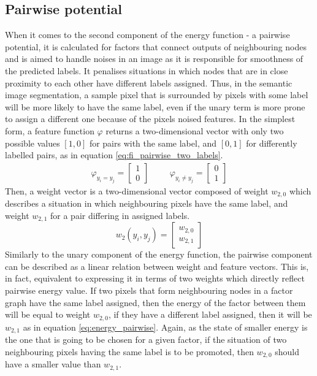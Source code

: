 \subsection{Pairwise potential}
\label{sec:pariwise_potential}

When it comes to the second component of the energy function - a pairwise potential, it is calculated for factors that connect outputs of neighbouring nodes and is aimed to handle noises in an image as it is responsible for smoothness of the predicted labels. It penalises situations in which nodes that are in close proximity to each other have different labels assigned. Thus, in the semantic image segmentation, a sample pixel that is surrounded by pixels with some label will be more likely to have the same label, even if the unary term is more prone to assign a different one because of the pixels noised features. In the simplest form, a feature function $\varphi$ returns a two-dimensional vector with only two possible values $[1,0]$ for pairs with the same label, and $[0,1]$ for differently labelled pairs, as in equation \ref{eq:fi_pairwise_two_labels}.
\begin{equation}
    \label{eq:fi_pairwise_two_labels}
    \begin{matrix}
        \varphi_{y_i = y_j} = \begin{bmatrix}
            1 \\
            0
        \end{bmatrix} & & &
        \varphi_{y_i \neq y_j} = \begin{bmatrix}
            0 \\
            1
        \end{bmatrix}
    \end{matrix}
\end{equation}
Then, a weight vector is a two-dimensional vector composed of weight $w_{2,0}$ which describes a situation in which neighbouring pixels have the same label, and weight $w_{2,1}$ for a pair differing in assigned labels. 
\begin{equation}
    \label{eq:weight_pairwise}
    w_2(y_i, y_j) = \begin{bmatrix}
        w_{2,0} \\ 
        w_{2,1}
    \end{bmatrix}
\end{equation}
Similarly to the unary component of the energy function, the pairwise component can be described as a linear relation between weight and feature vectors. This is, in fact, equivalent to expressing it in terms of two weights which directly reflect pairwise energy value. If two pixels that form neighbouring nodes in a factor graph have the same label assigned, then the energy of the factor between them will be equal to weight $w_{2,0}$, if they have a different label assigned, then it will be $w_{2,1}$ as in equation \ref{eq:energy_pairwise}. Again, as the state of smaller energy is the one that is going to be chosen for a given factor, if the situation of two neighbouring pixels having the same label is to be promoted, then $w_{2,0}$ should have a smaller value than $w_{2,1}$.
